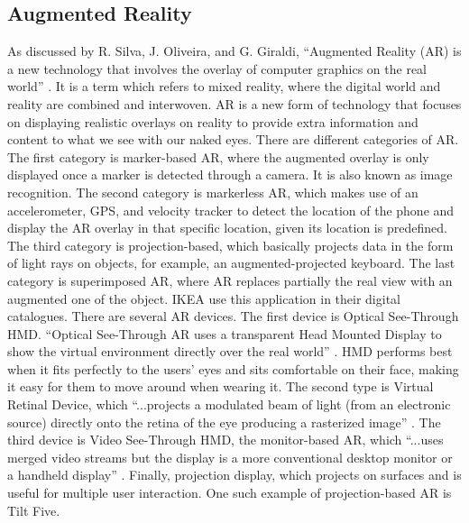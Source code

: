 \documentclass{aifyp}
\begin{document}
\subsection{Augmented Reality}
\indent  As discussed by R. Silva, J. Oliveira, and G. Giraldi, ``Augmented Reality (AR) is a new technology that involves the overlay of computer graphics on the real world” \cite{IntoToAR}. It is a term which refers to mixed reality, where the digital world and reality are combined and interwoven. AR is a new form of technology that focuses on displaying realistic overlays on reality to provide extra information and content to what we see with our naked eyes.
\newline
\newline
\indent There are different categories of AR. The first category is marker-based AR, where the augmented overlay is only displayed once a marker is detected through a camera. It is also known as image recognition. The second category is markerless AR, which makes use of an accelerometer, GPS, and velocity tracker to detect the location of the phone and display the AR overlay in that specific location, given its location is predefined. The third category is projection-based, which basically projects data in the form of light rays on objects, for example, an augmented-projected keyboard. The last category is superimposed AR, where AR replaces partially the real view with an augmented one of the object. IKEA use this application in their digital catalogues.
\newline
\newline
\indent There are several AR devices. The first device is Optical See-Through HMD. ``Optical See-Through AR uses a transparent Head Mounted Display to show the virtual environment directly over the real world” \cite{IntoToAR}. HMD performs best when it fits perfectly to the users’ eyes and sits comfortable on their face, making it easy for them to move around when wearing it. The second type is Virtual Retinal Device, which ``...projects a modulated beam of light (from an electronic source) directly onto the retina of the eye producing a rasterized image” \cite{IntoToAR}. The third device is Video See-Through HMD, the monitor-based AR, which ``...uses merged video streams but the display is a more conventional desktop monitor or a handheld display” \cite{IntoToAR}. Finally, projection display, which projects on surfaces and is useful for multiple user interaction. One such example of projection-based AR is Tilt Five.
\end{document}
